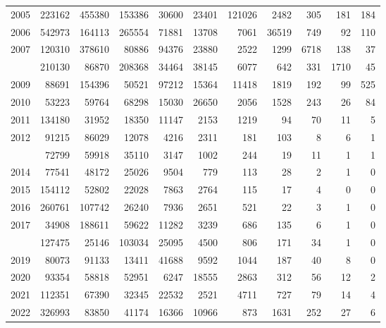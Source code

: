 \documentclass[
]{article}
\begin{document}
\begin{longtable}[t]{lrrrrrrrrrr}
2005 & 223162 & 455380 & 153386 & 30600 & 23401 & 121026 & 2482 & 305 & 181 & 184\\
2006 & 542973 & 164113 & 265554 & 71881 & 13708 & 7061 & 36519 & 749 & 92 & 110\\
2007 & 120310 & 378610 & 80886 & 94376 & 23880 & 2522 & 1299 & 6718 & 138 & 37\\
\addlinespace
2008 & 210130 & 86870 & 208368 & 34464 & 38145 & 6077 & 642 & 331 & 1710 & 45\\
2009 & 88691 & 154396 & 50521 & 97212 & 15364 & 11418 & 1819 & 192 & 99 & 525\\
2010 & 53223 & 59764 & 68298 & 15030 & 26650 & 2056 & 1528 & 243 & 26 & 84\\
2011 & 134180 & 31952 & 18350 & 11147 & 2153 & 1219 & 94 & 70 & 11 & 5\\
2012 & 91215 & 86029 & 12078 & 4216 & 2311 & 181 & 103 & 8 & 6 & 1\\
\addlinespace
2013 & 72799 & 59918 & 35110 & 3147 & 1002 & 244 & 19 & 11 & 1 & 1\\
2014 & 77541 & 48172 & 25026 & 9504 & 779 & 113 & 28 & 2 & 1 & 0\\
2015 & 154112 & 52802 & 22028 & 7863 & 2764 & 115 & 17 & 4 & 0 & 0\\
2016 & 260761 & 107742 & 26240 & 7936 & 2651 & 521 & 22 & 3 & 1 & 0\\
2017 & 34908 & 188611 & 59622 & 11282 & 3239 & 686 & 135 & 6 & 1 & 0\\
\addlinespace
2018 & 127475 & 25146 & 103034 & 25095 & 4500 & 806 & 171 & 34 & 1 & 0\\
2019 & 80073 & 91133 & 13411 & 41688 & 9592 & 1044 & 187 & 40 & 8 & 0\\
2020 & 93354 & 58818 & 52951 & 6247 & 18555 & 2863 & 312 & 56 & 12 & 2\\
2021 & 112351 & 67390 & 32345 & 22532 & 2521 & 4711 & 727 & 79 & 14 & 4\\
2022 & 326993 & 83850 & 41174 & 16366 & 10966 & 873 & 1631 & 252 & 27 & 6\\*
\end{longtable}
\end{document}
